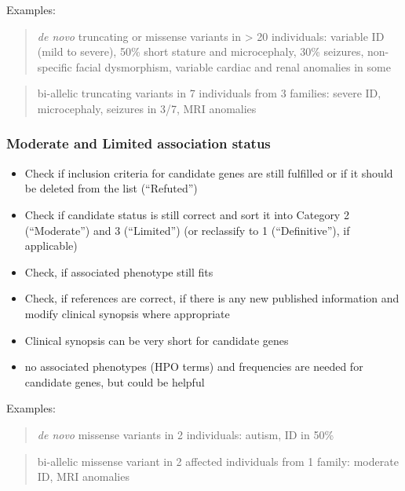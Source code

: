 \documentclass[
]{article}
\providecommand{\tightlist}{%
  \setlength{\itemsep}{0pt}\setlength{\parskip}{0pt}}
\begin{document}
Examples:

\begin{quote}
\emph{de novo} truncating or missense variants in \textgreater{} 20 individuals: variable ID (mild to severe), 50\% short stature and microcephaly, 30\% seizures, non-specific facial dysmorphism, variable cardiac and renal anomalies in some
\end{quote}

\begin{quote}
bi-allelic truncating variants in 7 individuals from 3 families: severe ID, microcephaly, seizures in 3/7, MRI anomalies
\end{quote}

\hypertarget{moderate-and-limited-association-status}{%
\subsubsection{Moderate and Limited association status}\label{moderate-and-limited-association-status}}

\begin{itemize}
\tightlist
\item
  Check if inclusion criteria for candidate genes are still fulfilled or if it should be deleted from the list (``Refuted'')
\item
  Check if candidate status is still correct and sort it into Category 2 (``Moderate'') and 3 (``Limited'') (or reclassify to 1 (``Definitive''), if applicable)
\item
  Check, if associated phenotype still fits
\item
  Check, if references are correct, if there is any new published information and modify clinical synopsis where appropriate
\item
  Clinical synopsis can be very short for candidate genes
\item
  no associated phenotypes (HPO terms) and frequencies are needed for candidate genes, but could be helpful
\end{itemize}

Examples:

\begin{quote}
\emph{de novo} missense variants in 2 individuals: autism, ID in 50\%
\end{quote}

\begin{quote}
bi-allelic missense variant in 2 affected individuals from 1 family: moderate ID, MRI anomalies
\end{quote}
\end{document}
